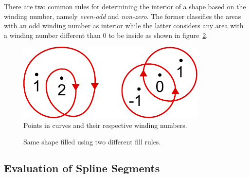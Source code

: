 \documentclass[11pt,a4paper,twoside]{article}
\begin{document}
There are two common rules for determining the interior of a shape based on the winding number, namely \emph{even-odd} and \emph{non-zero}. The former classifies the areas with an odd winding number as interior while the latter considers any area with a winding number different than $0$ to be inside as shown in figure~\ref{fig:fill_rule}.

\begin {figure}
	\centering
	\includegraphics [width=0.3\columnwidth] {figures/winding}
	\caption {Points in curves and their respective winding numbers.}
	\label {fig:winding}
\end {figure}

\begin {figure}
	\centering
	\quad
	\caption {Same shape filled using two different fill rules.}
	\label {fig:fill_rule}
\end {figure}

\subsection{Evaluation of Spline Segments}
\end{document}
